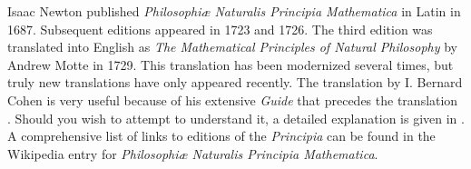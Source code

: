 Isaac Newton published \textit{Philosophi\ae{} Naturalis Principia Mathematica} in Latin in 1687. Subsequent editions appeared in 1723 and 1726. The third edition was translated into English as \textit{The Mathematical Principles of Natural Philosophy} by Andrew Motte in 1729. This translation has been modernized several times, but truly new translations have only appeared recently. The translation by I. Bernard Cohen is very useful because of his extensive \textit{Guide} that precedes the translation \cite{newton-cohen}.  Should you wish to attempt to understand it, a detailed explanation is given in \cite[pp.~324--329]{newton-cohen}. A comprehensive list of links to editions of the \textit{Principia} can be found in the Wikipedia entry for \textit{Philosophi\ae{} Naturalis Principia Mathematica}.

